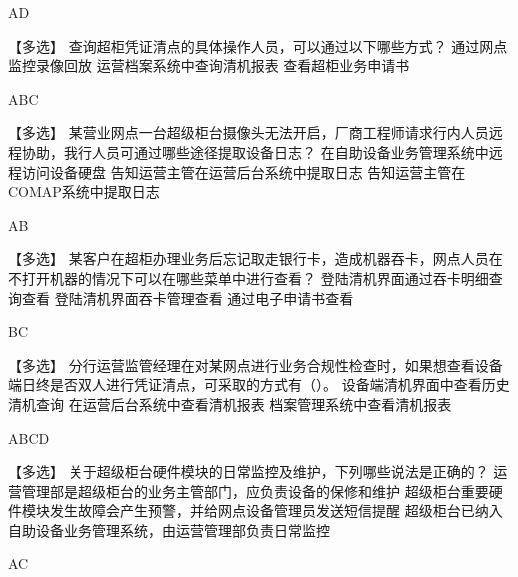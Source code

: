 \documentclass[kindlepaper]{BHCexam4kindle}
\begin{document}
\begin{questions}
\begin{solution} AD \end{solution}
\qs 【多选】 查询超柜凭证清点的具体操作人员，可以通过以下哪些方式？ \xx
{} {  通过网点监控录像回放 } { 运营档案系统中查询清机报表 } { 查看超柜业务申请书 }
\begin{solution} ABC \end{solution}
\qs 【多选】 某营业网点一台超级柜台摄像头无法开启，厂商工程师请求行内人员远程协助，我行人员可通过哪些途径提取设备日志？ \xx
{} {  在自助设备业务管理系统中远程访问设备硬盘 } { 告知运营主管在运营后台系统中提取日志 } { 告知运营主管在COMAP系统中提取日志 }
\begin{solution} AB \end{solution}
\qs 【多选】 某客户在超柜办理业务后忘记取走银行卡，造成机器吞卡，网点人员在不打开机器的情况下可以在哪些菜单中进行查看？ \xx
{} {  登陆清机界面通过吞卡明细查询查看 } { 登陆清机界面吞卡管理查看 } { 通过电子申请书查看 }
\begin{solution} BC \end{solution}
\qs 【多选】 分行运营监管经理在对某网点进行业务合规性检查时，如果想查看设备端日终是否双人进行凭证清点，可采取的方式有（）。 \xx
{} {  设备端清机界面中查看历史清机查询 } { 在运营后台系统中查看清机报表 } { 档案管理系统中查看清机报表 }
\begin{solution} ABCD \end{solution}
\qs 【多选】 关于超级柜台硬件模块的日常监控及维护，下列哪些说法是正确的？ \xx
{} {  运营管理部是超级柜台的业务主管部门，应负责设备的保修和维护 } { 超级柜台重要硬件模块发生故障会产生预警，并给网点设备管理员发送短信提醒 } { 超级柜台已纳入自助设备业务管理系统，由运营管理部负责日常监控 }
\begin{solution} AC \end{solution}

\end{questions}
\end{document}

